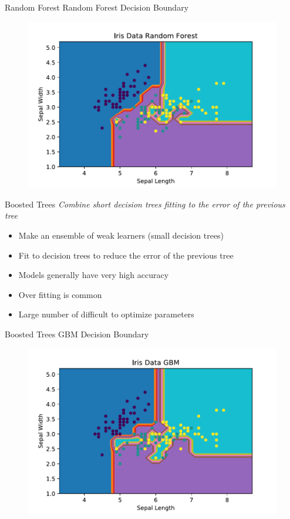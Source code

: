 \documentclass[10pt]{beamer}
\begin{document}
\begin{frame}{Random Forest}
Random Forest Decision Boundary
		\begin{figure}	
			\includegraphics[width=1.0\textwidth, center, trim=0cm 0cm 0 0cm]{images/Iris_Data_RF.pdf}
	\end{figure}
\end{frame}

\begin{frame}{Boosted Trees}
\emph{Combine short decision trees fitting to the error of the previous tree}
	\begin{itemize}
		\item Make an ensemble of weak learners (small decision trees)
		\item Fit to decision trees to reduce the error of the previous tree
		\item Models generally have very high accuracy
		\item Over fitting is common
		\item Large number of difficult to optimize parameters
	\end{itemize}
\end{frame}

\begin{frame}{Boosted Trees}
GBM Decision Boundary
		\begin{figure}	
			\includegraphics[width=1.0\textwidth, center, trim=0cm 0cm 0 0cm]{images/Iris_Data_GBM.pdf}
	\end{figure}
\end{frame}
\end{document}
